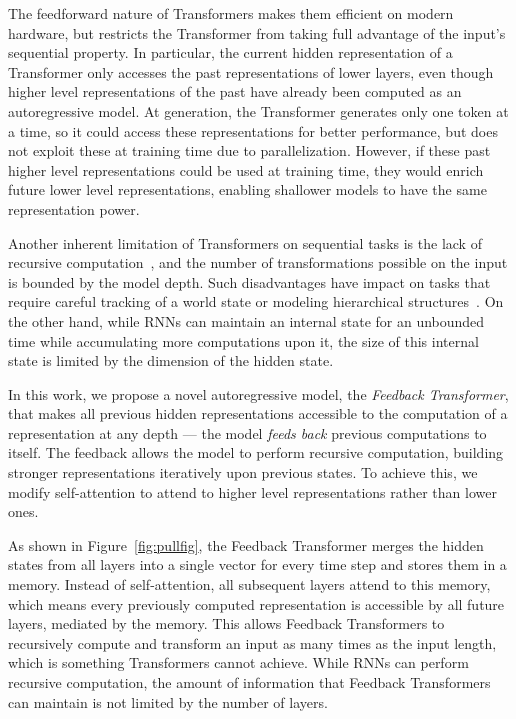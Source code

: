 \documentclass{article} \usepackage{iclr2021_conference}
\newcommand{\fig}[1]{Figure~\ref{fig:#1}}
\begin{document}
The feedforward nature of Transformers makes them efficient on modern hardware, but restricts the Transformer from taking full advantage of the input's sequential property.
In particular, the current hidden representation of a Transformer only accesses the past representations of lower layers, even though higher level representations of the past have already been computed as an autoregressive model.
At generation, the Transformer generates only one token at a time, so it could access these representations for better performance, but  does not exploit these at training time due to parallelization.
However, if these past higher level representations could be used at training time, they would enrich future lower level representations, enabling shallower models to have the same representation power.

Another inherent limitation of Transformers on sequential tasks is the lack of recursive computation~\citep{dehghani2018universal}, and the number of transformations possible on the input is bounded by the model depth. 
Such disadvantages have impact on tasks that require careful tracking of a world state or modeling hierarchical structures~\citep{tran2018importance,hahn2020theoretical}.
On the other hand, while RNNs can maintain an internal state for an unbounded time while accumulating more computations upon it, the size of this internal state is limited by the dimension of the hidden state. 

In this work, we propose a novel autoregressive model, the \textit{Feedback Transformer}, that makes all previous hidden representations accessible to the computation of a representation at any depth --- the model \emph{feeds back} previous computations to itself.
The feedback allows the model to perform recursive computation, building stronger representations iteratively upon previous states.
To achieve this, we modify self-attention to attend to higher level representations rather than lower ones.

As shown in \fig{pullfig}, the Feedback Transformer merges the hidden states from all layers into a single vector for every time step and stores them in a memory. 
Instead of self-attention, all subsequent layers attend to this memory, which means every previously computed representation is accessible by all future layers, mediated by the memory.
This allows Feedback Transformers to recursively compute and transform an input as many times as the input length, which is something Transformers cannot achieve.
While RNNs can perform recursive computation, the amount of information that Feedback Transformers can maintain is not limited by the number of layers.
\end{document}
